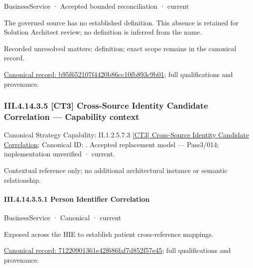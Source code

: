 \label{element:b95f652107f4420b86cc10fb893c9b01}
{\small BusinessService · Accepted bounded reconciliation · current}\par

The governed source has no established definition. This absence is retained for Solution Architect review; no definition is inferred from the name.


{\small Recorded unresolved matters: definition; exact scope remains in the canonical record.}\par
{\footnotesize \href{../../../../../../../../continuum/business/business-service/b95f652107f4420b86cc10fb893c9b01.md}{Canonical record: b95f652107f4420b86cc10fb893c9b01}; full qualifications and provenance.}\par
\subsubsection*{III.4.14.3.5 [CT3] Cross-Source Identity Candidate Correlation — Capability context}
\label{navigation:III.4.14.3.5}

{\small Canonical Strategy Capability: II.1.2.5.7.3 \hyperref[element:60d97cd46fde4349864aa737526f08cb]{[CT3] Cross-Source Identity Candidate Correlation}; Canonical ID: \texttt{}. Accepted replacement model — Pass3/014; implementation unverified · current.}\par
Contextual reference only; no additional architectural instance or semantic relationship.\par
\paragraph*{III.4.14.3.5.1 Person Identifier Correlation}
\label{navigation:III.4.14.3.5.1}

\label{element:71220901361e42f686faf7d852f57e45}
{\small BusinessService · Canonical · current}\par

Exposed across the HIE to establish patient cross-reference mappings.


{\footnotesize \href{../../../../../../../../continuum/business/business-service/71220901361e42f686faf7d852f57e45.md}{Canonical record: 71220901361e42f686faf7d852f57e45}; full qualifications and provenance.}\par
